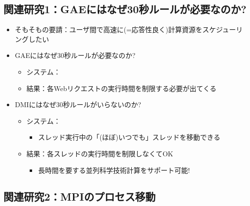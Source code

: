 \documentclass[25pt,papersize,landscape]{jsarticle}
\begin{document}
\subsection{関連研究1：GAEにはなぜ30秒ルールが必要なのか?}

\begin{itemize}
\item そもそもの要請：ユーザ間で高速に(=応答性良く)計算資源をスケジューリングしたい
\item GAEにはなぜ30秒ルールが必要なのか?
  \begin{itemize}
  \item システム：
  \item 結果：各Webリクエストの実行時間を制限する必要が出てくる
  \end{itemize}
\item DMIにはなぜ30秒ルールがいらないのか?
  \begin{itemize}
  \item システム：
    \begin{itemize}
    \item スレッド実行中の「(ほぼ)いつでも」スレッドを移動できる
    \end{itemize}
  \item 結果：各スレッドの実行時間を制限しなくてOK
    \begin{itemize}
    \item 長時間を要する並列科学技術計算をサポート可能!
    \end{itemize}
  \end{itemize}
\end{itemize}

\subsection{関連研究2：MPIのプロセス移動}
\end{document}
